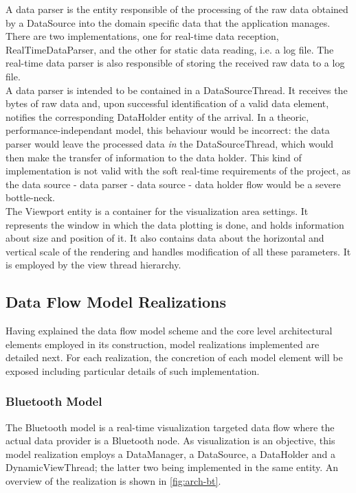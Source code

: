 		A data parser is the entity responsible of the processing of the raw data obtained by a DataSource into the domain specific data that the application manages. There are two implementations, one for real-time data reception, RealTimeDataParser, and the other for static data reading, i.e. a log file. The real-time data parser is also responsible of storing the received raw data to a log file.\\

		A data parser is intended to be contained in a DataSourceThread. It receives the bytes of raw data and, upon successful identification of a valid data element, notifies the corresponding DataHolder entity of the arrival. In a theoric, performance-independant model, this behaviour would be incorrect: the data parser would leave the processed data \emph{in} the DataSourceThread, which would then make the transfer of information to the data holder. This kind of implementation is not valid with the soft real-time requirements of the project, as the data source - data parser - data source - data holder flow would be a severe bottle-neck.\\

		The Viewport entity is a container for the visualization area settings. It represents the window in which the data plotting is done, and holds information about size and position of it. It also contains data about the horizontal and vertical scale of the rendering and handles modification of all these parameters. It is employed by the view thread hierarchy.
		
		\subsection{Data Flow Model Realizations}

		Having explained the data flow model scheme and the core level architectural elements employed in its construction, model realizations implemented are detailed next. For each realization, the concretion of each model element will be exposed including particular details of such implementation.

		\subsubsection{Bluetooth Model}
			The Bluetooth model is a real-time visualization targeted data flow where the actual data provider is a Bluetooth node. As visualization is an objective, this model realization employs a DataManager, a DataSource, a DataHolder and a DynamicViewThread; the latter two being implemented in the same entity. An overview of the realization is shown in \autoref{fig:arch-bt}.\\

